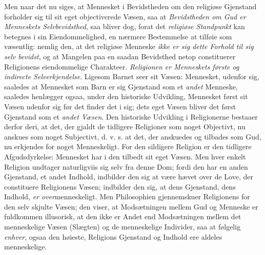 Men naar det nu siges, at Mennesket i Bevidstheden om den religiøse Gjenstand
forholder sig til sit eget objectiverede Væsen, saa at \emph{Bevidstheden om
Gud er Menneskets Selvbevidsthed}, saa bliver dog, forat det \emph{religiøse
Standpunkt} kan betegnes i sin Eiendommelighed, en nærmere Bestemmelse at
tilføie som væsentlig: nemlig den, at det religiøse Menneske \emph{ikke er sig
dette Forhold til sig selv bevidst}, og at Mangelen paa en saadan Bevidsthed
netop constituerer Religionens eiendommelige Charakteer. \emph{Religionen er
Menneskets første og indirecte Selverkjendelse}. Ligesom Barnet seer sit Væsen:
Mennesket, udenfor sig, saaledes at Mennesket som Barn er sig Gjenstand som et
\emph{andet} Menneske, saaledes henlægger ogsaa, under den historiske
Udvikling, Mennesket først sit Væsen udenfor sig før det finder det i sig; dets
eget Væsen bliver det først Gjenstand som et \emph{andet Væsen}. Den historiske
Udvikling i Religionerne bestaaer derfor deri, at det, der gjaldt de tidligere
Religioner som noget Objectivt, nu anskues som noget Subjectivt, d. v. s. at
det, der anskuedes og tilbades som Gud, nu erkjendes for noget Menneskeligt.
For den
 sildigere Religion er den tidligere Afgudsdyrkelse: Mennesket har i den tilbedt
sit eget Væsen. Men hver enkelt Religion undtager naturligviis sig selv fra
denne Dom; fordi den har en anden Gjenstand, et andet Indhold, indbilder den
sig at være hævet over de Love, der constituere Religionens Væsen; indbilder
den sig, at dens Gjenstand, dens Indhold, \emph{er over}menneskeligt. Men
Philosophien gjennemskuer Religionens for den selv skjulte Væsen; den viser, at
Modsætningen mellem Gud og Menneske er fuldkommen illusorisk, at den ikke er
Andet end Modsætningen mellem det menneskelige Væsen (Slægten) og de
menneskelige Individer, saa at følgelig \emph{enhver}, ogsaa den høieste,
Religions Gjenstand og Indhold ere aldeles menneskelige.

